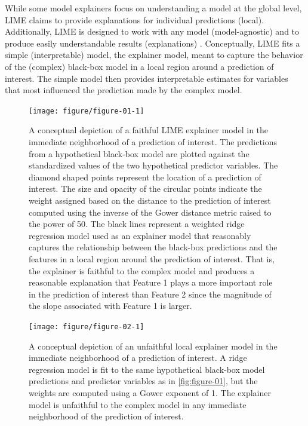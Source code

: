\documentclass[AMS,STIX2COL]{WileyNJD-v2}\usepackage[]{graphicx}\usepackage[]{color}
\newenvironment{knitrout}{}{} %
\begin{document}
While some model explainers focus on understanding a model at the global level, LIME claims to provide explanations for individual predictions (local). Additionally, LIME is designed to work with any model (model-agnostic) and to produce easily understandable results (explanations) \citep{ribeiro:2016}. Conceptually, LIME fits a simple (interpretable) model, the explainer model,  meant to capture the behavior of the (complex) black-box model in a local region around a prediction of interest. The  simple model then provides interpretable estimates for variables that most influenced the prediction made by the complex model.





\begin{figure}[!thp]
\begin{knitrout}
\color{fgcolor}

{\centering \texttt{[image: figure/figure-01-1]} 

}



\end{knitrout}
\caption{A conceptual depiction of a faithful LIME explainer model in the immediate neighborhood of a prediction of interest. The predictions from a hypothetical black-box model are plotted against the standardized values of the two hypothetical predictor variables. The diamond shaped points represent the location of a prediction of interest. The size and opacity of the circular points indicate the weight assigned based on the distance to the prediction of interest computed using the inverse of the Gower distance metric raised to the power of 50. The black lines represent  a weighted ridge regression model used as an explainer model that reasonably captures the relationship between the black-box predictions and the features in a local region around the prediction of interest. That is, the explainer is faithful to the complex model and produces a reasonable explanation that Feature 1 plays a more important role in the prediction of interest than Feature 2 since the magnitude of the slope associated with Feature 1 is larger.}
\label{fig:figure-01}

\vspace*{\floatsep}
 
\begin{knitrout}
\color{fgcolor}

{\centering \texttt{[image: figure/figure-02-1]} 

}



\end{knitrout}
\caption{A conceptual depiction of an unfaithful local explainer model in the immediate neighborhood of a prediction of interest. A ridge regression model is fit to the same hypothetical black-box model predictions and predictor variables as in \autoref{fig:figure-01}, but the weights are computed using a Gower exponent of 1. The explainer model is unfaithful to the complex model in any immediate neighborhood of the prediction of interest.}
\label{fig:figure-02}
\end{figure}
\end{document}
